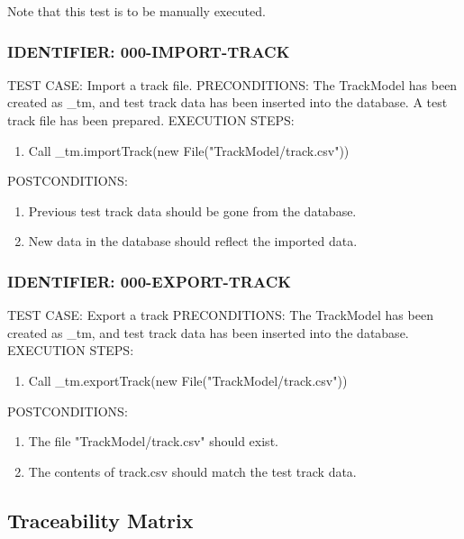\documentclass{scrreprt}
\begin{document}
Note that this test is to be manually executed.

\subsubsection{IDENTIFIER: 000-IMPORT-TRACK}
TEST CASE: Import a track file.
PRECONDITIONS: The TrackModel has been created as _tm, and test track data has been inserted into the database. A test track file has been prepared.
EXECUTION STEPS:
\begin{enumerate}
	\item Call _tm.importTrack(new File("TrackModel/track.csv"))
\end{enumerate}
POSTCONDITIONS:
\begin{enumerate}
	\item Previous test track data should be gone from the database.
	\item New data in the database should reflect the imported data.
\end{enumerate}

\subsubsection{IDENTIFIER: 000-EXPORT-TRACK}
TEST CASE: Export a track
PRECONDITIONS: The TrackModel has been created as _tm, and test track data has been inserted into the database.
EXECUTION STEPS:
\begin{enumerate}
	\item Call _tm.exportTrack(new File("TrackModel/track.csv"))
\end{enumerate}
POSTCONDITIONS:
\begin{enumerate}
	\item The file "TrackModel/track.csv" should exist.
	\item The contents of track.csv should match the test track data.
\end{enumerate}

\subsection{Traceability Matrix}
\end{document}
